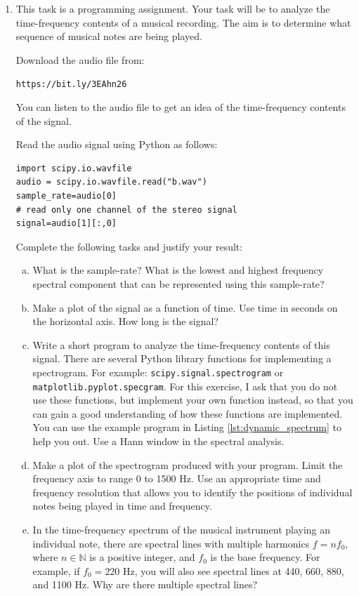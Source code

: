 \begin{enumerate}
\item This task is a programming assignment. Your task will be to analyze
the time-frequency contents of a musical recording. The aim is to
determine what sequence of musical notes are being played. 

Download the audio file from:
\begin{center}
\verb|https://bit.ly/3EAhn26| 
\end{center}
You can listen to the audio file to get an idea of the time-frequency
contents of the signal.

Read the audio signal using Python as follows:
\begin{verbatim}
import scipy.io.wavfile
audio = scipy.io.wavfile.read("b.wav")
sample_rate=audio[0]
# read only one channel of the stereo signal
signal=audio[1][:,0]
\end{verbatim}

Complete the following tasks and justify your result:
\begin{enumerate}[a)]

\item What is the sample-rate? What is the lowest and highest
  frequency spectral component that can be represented using this
  sample-rate? 

\item Make a plot of the signal as a function of time. Use time in
  seconds on the horizontal axis. How long is the signal?
    
\item Write a short program to analyze the time-frequency contents of
  this signal. There are several Python library functions for
  implementing a spectrogram. For example:
  \verb|scipy.signal.spectrogram| or
  \verb|matplotlib.pyplot.specgram|. For this exercise, I ask that you
  do not use these functions, but implement your own function instead,
  so that you can gain a good understanding of how these functions are
  implemented. You can use the example program in Listing
  \ref{lst:dynamic_spectrum} to help you out. Use a Hann window in the
  spectral analysis.

\item Make a plot of the spectrogram produced with your program. Limit
  the frequency axis to range 0 to 1500 Hz. Use an appropriate time
  and frequency resolution that allows you to identify the positions
  of individual notes being played in time and frequency.

\item In the time-frequency spectrum of the musical instrument playing
  an individual note, there are spectral lines with multiple harmonics
  $f = n f_0$, where $n \in \mathbb{N}$ is a positive integer, and
  $f_0$ is the base frequency. For example, if $f_0= 220$ Hz, you will
  also see spectral lines at 440, 660, 880, and 1100 Hz. Why are there
  multiple spectral lines?


\end{enumerate}
\end{enumerate}
